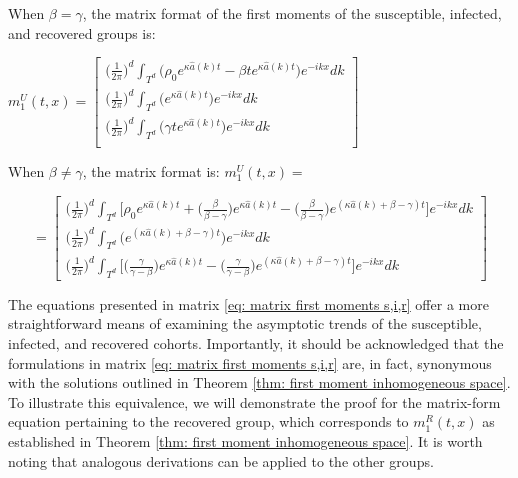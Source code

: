 \documentclass[sn-basic]{sn-jnl}%
\theoremstyle{thmstyleone}%
\theoremstyle{thmstyletwo}%
\theoremstyle{thmstylethree}%
\numberwithin{equation}{theorem}
\begin{document}
When $\beta=\gamma$, the matrix format of the first moments of the susceptible, infected, and recovered groups is:\\
\begin{center}
${m}_{1}^{U}(t,x) = \begin{bmatrix}
\displaystyle \Big(\frac{1}{2 \pi} \Big)^{d} \int_{T^d} \Big(\rho_{0}  e^{\displaystyle \kappa \hat{a}(k)t} -\beta t e^{\displaystyle \kappa \hat{a}(k) t} \Big) e^{\displaystyle -ikx} dk \\
\displaystyle \Big(\frac{1}{2 \pi} \Big)^{d} \int_{T^d} \Big( e^{\displaystyle \kappa \hat{a}(k)t} \Big) \displaystyle e^{\displaystyle -ikx} dk \\
\displaystyle \Big(\frac{1}{2 \pi} \Big)^{d} \int_{T^d} \Big(\gamma t  e^{\displaystyle \kappa \hat{a}(k)t} \Big) e^{\displaystyle -ikx} dk \\ \end{bmatrix}$\\
\end{center}

When $\beta \neq \gamma$, the matrix format is: ${m}_{1}^{U}(t,x)=$ 

\begin{equation}\label{eq: matrix first moments s,i,r}
= \begin{bmatrix}
 \Big(\frac{1}{2 \pi} \Big)^{d} \int_{T^d} \Big[\rho_{0} e^{ \kappa \hat{a}(k)t} + \Big(\frac{\beta}{\beta-\gamma}\Big)  e^{ \kappa \hat{a}(k) t} - \Big(\frac{\beta}{\beta-\gamma}\Big)  e^{ (\kappa \hat{a}(k)+\beta-\gamma)t} \Big] e^{ -ikx} dk \\
\Big(\frac{1}{2 \pi} \Big)^{d} \int_{T^d} \Big(e^{ (\kappa \hat{a}(k)+\beta-\gamma)t} \Big) e^{ -ikx} dk \\
\Big(\frac{1}{2 \pi} \Big)^{d} \int_{T^d} \Big[\Big(\frac{\gamma}{\gamma-\beta}\Big) e^{\kappa \hat{a}(k)t} - \Big(\frac{\gamma}{\gamma-\beta}\Big) e^{ (\kappa \hat{a}(k)+\beta-\gamma)t} \Big] e^{ -ikx} dk 
\end{bmatrix}
\end{equation}


The equations presented in matrix \eqref{eq: matrix first moments s,i,r} offer a more straightforward means of examining the asymptotic trends of the susceptible, infected, and recovered cohorts. Importantly, it should be acknowledged that the formulations in matrix \eqref{eq: matrix first moments s,i,r} are, in fact, synonymous with the solutions outlined in Theorem \ref{thm: first moment inhomogeneous space}. To illustrate this equivalence, we will demonstrate the proof for the matrix-form equation pertaining to the recovered group, which corresponds to $m_{1}^{R}(t,x)$ as established in Theorem \ref{thm: first moment inhomogeneous space}. It is worth noting that analogous derivations can be applied to the other groups.
\end{document}
